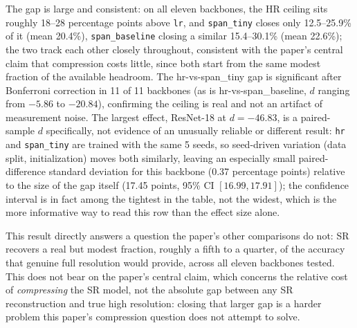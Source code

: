 \documentclass[pdflatex,sn-vancouver-num]{sn-jnl}
\begin{document}
The gap is large and consistent: on all eleven backbones, the HR ceiling sits roughly 18--28 percentage points above \texttt{lr}, and \texttt{span\_tiny} closes only 12.5--25.9\% of it (mean 20.4\%), \texttt{span\_baseline} closing a similar 15.4--30.1\% (mean 22.6\%); the two track each other closely throughout, consistent with the paper's central claim that compression costs little, since both start from the same modest fraction of the available headroom. The hr-vs-span\_tiny gap is significant after Bonferroni correction in 11 of 11 backbones (as is hr-vs-span\_baseline, $d$ ranging from $-5.86$ to $-20.84$), confirming the ceiling is real and not an artifact of measurement noise. The largest effect, ResNet-18 at $d{=}{-}46.83$, is a paired-sample $d$ specifically, not evidence of an unusually reliable or different result: \texttt{hr} and \texttt{span\_tiny} are trained with the same 5 seeds, so seed-driven variation (data split, initialization) moves both similarly, leaving an especially small paired-difference standard deviation for this backbone (0.37 percentage points) relative to the size of the gap itself (17.45 points, 95\% CI $[16.99, 17.91]$); the confidence interval is in fact among the tightest in the table, not the widest, which is the more informative way to read this row than the effect size alone.

This result directly answers a question the paper's other comparisons do not: SR recovers a real but modest fraction, roughly a fifth to a quarter, of the accuracy that genuine full resolution would provide, across all eleven backbones tested. This does not bear on the paper's central claim, which concerns the relative cost of \emph{compressing} the SR model, not the absolute gap between any SR reconstruction and true high resolution: closing that larger gap is a harder problem this paper's compression question does not attempt to solve.
\end{document}
